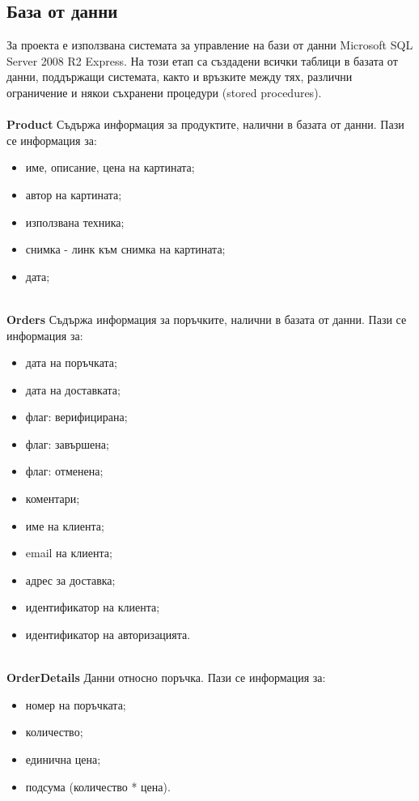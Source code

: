 \documentclass[a4paper,14pt]{article}
\begin{document}
\subsection{База от данни}
За проекта е използвана системата за управление на бази от данни Microsoft SQL Server
2008 R2 Express. На този етап са създадени всички таблици в базата от данни, поддържащи
системата, както и връзките между тях, различни ограничение и някои съхранени процедури
(stored procedures).
\\
\\
\textbf{Product} Съдържа информация за продуктите, налични в базата от данни. Пази се информация за:
\begin{itemize}
\item име, описание, цена на картината;
\item автор на картината;
\item използвана техника;
\item снимка - линк към снимка на картината;
\item дата;
\end{itemize}
\\
\textbf{Orders} Съдържа информация за поръчките, налични в базата от данни. Пази се информация за:
\begin{itemize}
\item дата на поръчката;
\item дата на доставката;
\item флаг: верифицирана;
\item флаг: завършена;
\item флаг: отменена;
\item коментари;
\item име на клиента;
\item email на клиента;
\item адрес за доставка;
\item идентификатор на клиента;
\item идентификатор на авторизацията.
\end{itemize}
\\
\textbf{OrderDetails} Данни относно поръчка. Пази се информация за:
\begin{itemize}
\item номер на поръчката;
\item количество;
\item единична цена;
\item подсума (количество * цена).
\end{itemize}
\\
\end{document}
